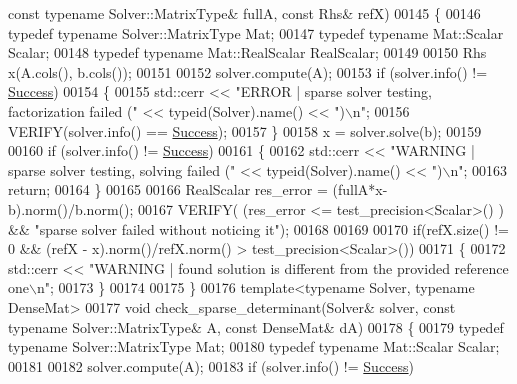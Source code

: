 \begin{DoxyCode}
{      const} \textcolor{keyword}{typename} Solver::MatrixType& fullA, \textcolor{keyword}{const} Rhs& refX)
00145 \{
00146   \textcolor{keyword}{typedef} \textcolor{keyword}{typename} Solver::MatrixType Mat;
00147   \textcolor{keyword}{typedef} \textcolor{keyword}{typename} Mat::Scalar Scalar;
00148   \textcolor{keyword}{typedef} \textcolor{keyword}{typename} Mat::RealScalar RealScalar;
00149   
00150   Rhs x(A.cols(), b.cols());
00151 
00152   solver.compute(A);
00153   \textcolor{keywordflow}{if} (solver.info() != \hyperlink{group__enums_gga85fad7b87587764e5cf6b513a9e0ee5ea52581b035f4b59c203b8ff999ef5fcea}{Success})
00154   \{
00155     std::cerr << \textcolor{stringliteral}{"ERROR | sparse solver testing, factorization failed ("} << \textcolor{keyword}{typeid}(Solver).name() << \textcolor{stringliteral}{")\(\backslash\)n"};
00156     VERIFY(solver.info() == \hyperlink{group__enums_gga85fad7b87587764e5cf6b513a9e0ee5ea52581b035f4b59c203b8ff999ef5fcea}{Success});
00157   \}
00158   x = solver.solve(b);
00159   
00160   \textcolor{keywordflow}{if} (solver.info() != \hyperlink{group__enums_gga85fad7b87587764e5cf6b513a9e0ee5ea52581b035f4b59c203b8ff999ef5fcea}{Success})
00161   \{
00162     std::cerr << \textcolor{stringliteral}{"WARNING | sparse solver testing, solving failed ("} << \textcolor{keyword}{typeid}(Solver).name() << \textcolor{stringliteral}{")\(\backslash\)n"};
00163     \textcolor{keywordflow}{return};
00164   \}
00165   
00166   RealScalar res\_error = (fullA*x-b).norm()/b.norm();  
00167   VERIFY( (res\_error <= test\_precision<Scalar>() ) && \textcolor{stringliteral}{"sparse solver failed without noticing it"}); 
00168 
00169   
00170   \textcolor{keywordflow}{if}(refX.size() != 0 && (refX - x).norm()/refX.norm() > test\_precision<Scalar>())
00171   \{
00172     std::cerr << \textcolor{stringliteral}{"WARNING | found solution is different from the provided reference one\(\backslash\)n"};
00173   \}
00174   
00175 \}
00176 \textcolor{keyword}{template}<\textcolor{keyword}{typename} Solver, \textcolor{keyword}{typename} DenseMat>
00177 \textcolor{keywordtype}{void} check\_sparse\_determinant(Solver& solver, \textcolor{keyword}{const} \textcolor{keyword}{typename} Solver::MatrixType& A, \textcolor{keyword}{const} DenseMat& dA)
00178 \{
00179   \textcolor{keyword}{typedef} \textcolor{keyword}{typename} Solver::MatrixType Mat;
00180   \textcolor{keyword}{typedef} \textcolor{keyword}{typename} Mat::Scalar Scalar;
00181   
00182   solver.compute(A);
00183   \textcolor{keywordflow}{if} (solver.info() != \hyperlink{group__enums_gga85fad7b87587764e5cf6b513a9e0ee5ea52581b035f4b59c203b8ff999ef5fcea}{Success})

\end{DoxyCode}
